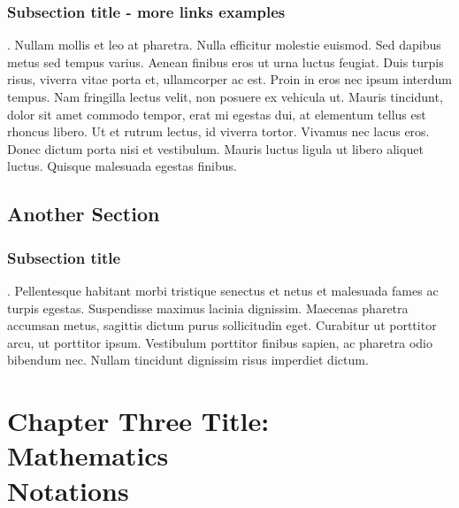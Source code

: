 \subsection{Subsection title - more links examples}.
Nullam mollis et leo at pharetra. Nulla efficitur molestie euismod. Sed dapibus metus sed tempus varius. Aenean finibus eros ut urna luctus feugiat. Duis turpis risus, viverra vitae porta et, ullamcorper ac est. Proin in eros nec ipsum interdum tempus. Nam fringilla lectus velit, non posuere ex vehicula ut. Mauris tincidunt, dolor sit amet commodo tempor, erat mi egestas dui, at elementum tellus est rhoncus libero. Ut et rutrum lectus, id viverra tortor. Vivamus nec lacus eros. Donec dictum porta nisi et vestibulum. Mauris luctus ligula ut libero aliquet luctus. Quisque malesuada egestas finibus.

\section{Another Section}
\subsection{Subsection title}.
Pellentesque habitant morbi tristique senectus et netus et malesuada fames ac turpis egestas. Suspendisse maximus lacinia dignissim. Maecenas pharetra accumsan metus, sagittis dictum purus sollicitudin eget. Curabitur ut porttitor arcu, ut porttitor ipsum. Vestibulum porttitor finibus sapien, ac pharetra odio bibendum nec. Nullam tincidunt dignissim risus imperdiet dictum.

\chapter[Chapter Three Title: Mathematics Notations]{Chapter Three Title:\\ Mathematics\\ Notations}
